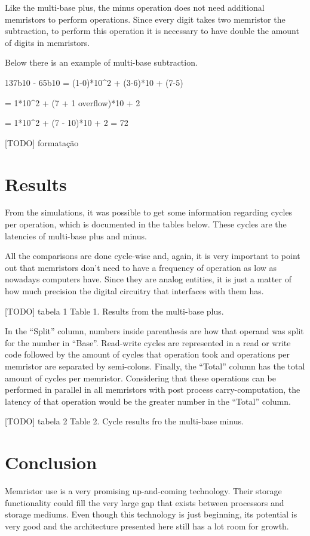 \documentclass[ecp,tc,english]{iiufrgs}
\begin{document}
Like the multi-base plus, the minus operation does not need additional memristors to perform operations. Since every digit takes two memristor the subtraction, to perform this operation it is necessary to have double the amount of digits in memristors.

Below there is an example of multi-base subtraction.

137b10 - 65b10 = (1-0)*10^2 + (3-6)*10 + (7-5)

= 1*10^2 + (7 + 1 overflow)*10 + 2

= 1*10^2 + (7 - 10)*10 + 2 = 72

[TODO] formatação

\chapter{Results}

From the simulations, it was possible to get some information regarding cycles per operation, which is documented in the tables below. These cycles are the latencies of multi-base plus and minus.

All the comparisons are done cycle-wise and, again, it is very important to point out that memristors don't need to have a frequency of operation as low as nowadays computers have. Since they are analog entities, it is just a matter of how much precision the digital circuitry that interfaces with them has.

[TODO] tabela 1
Table 1. Results from the multi-base plus.

In the “Split” column, numbers inside parenthesis are how that operand was split for the number in “Base”. Read-write cycles are represented in a read or write code followed by the amount of cycles that operation took and operations per memristor are separated by semi-colons. Finally, the “Total” column has the total amount of cycles per memristor. Considering that these operations can be performed in parallel in all memristors with post process carry-computation, the latency of that operation would be the greater number in the “Total” column.

[TODO] tabela 2
Table 2. Cycle results fro the multi-base minus.

\chapter{Conclusion}

Memristor use is a very promising up-and-coming technology. Their storage functionality could fill the very large gap that exists between processors and storage mediums. Even though this technology is just beginning, its potential is very good and the architecture presented here still has a lot room for growth.
\end{document}
